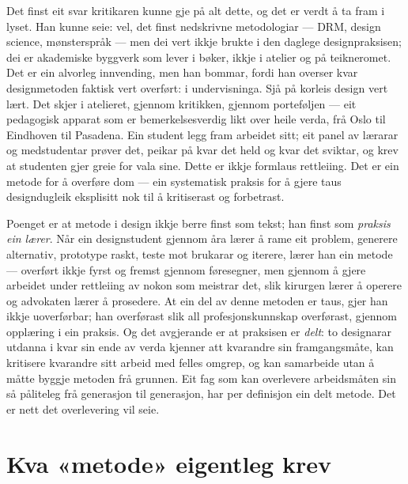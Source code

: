 Det finst eit svar kritikaren kunne gje på alt dette, og det er verdt å ta fram i lyset. Han kunne seie: vel, det finst nedskrivne metodologiar — DRM, design science, mønsterspråk — men dei vert ikkje brukte i den daglege designpraksisen; dei er akademiske byggverk som lever i bøker, ikkje i atelier og på teikneromet. Det er ein alvorleg innvending, men han bommar, fordi han overser kvar designmetoden faktisk vert overført: i undervisninga. Sjå på korleis design vert lært. Det skjer i atelieret, gjennom kritikken, gjennom porteføljen — eit pedagogisk apparat som er bemerkelsesverdig likt over heile verda, frå Oslo til Eindhoven til Pasadena. Ein student legg fram arbeidet sitt; eit panel av lærarar og medstudentar prøver det, peikar på kvar det held og kvar det sviktar, og krev at studenten gjer greie for vala sine. Dette er ikkje formlaus rettleiing. Det er ein metode for å overføre dom — ein systematisk praksis for å gjere taus designdugleik eksplisitt nok til å kritiserast og forbetrast.

Poenget er at metode i design ikkje berre finst som tekst; han finst som \emph{praksis ein lærer}. Når ein designstudent gjennom åra lærer å rame eit problem, generere alternativ, prototype raskt, teste mot brukarar og iterere, lærer han ein metode — overført ikkje fyrst og fremst gjennom føresegner, men gjennom å gjere arbeidet under rettleiing av nokon som meistrar det, slik kirurgen lærer å operere og advokaten lærer å prosedere. At ein del av denne metoden er taus, gjer han ikkje uoverførbar; han overførast slik all profesjonskunnskap overførast, gjennom opplæring i ein praksis. Og det avgjerande er at praksisen er \emph{delt}: to designarar utdanna i kvar sin ende av verda kjenner att kvarandre sin framgangsmåte, kan kritisere kvarandre sitt arbeid med felles omgrep, og kan samarbeide utan å måtte byggje metoden frå grunnen. Eit fag som kan overlevere arbeidsmåten sin så påliteleg frå generasjon til generasjon, har per definisjon ein delt metode. Det er nett det overlevering vil seie.

\section{Kva «metode» eigentleg krev}


